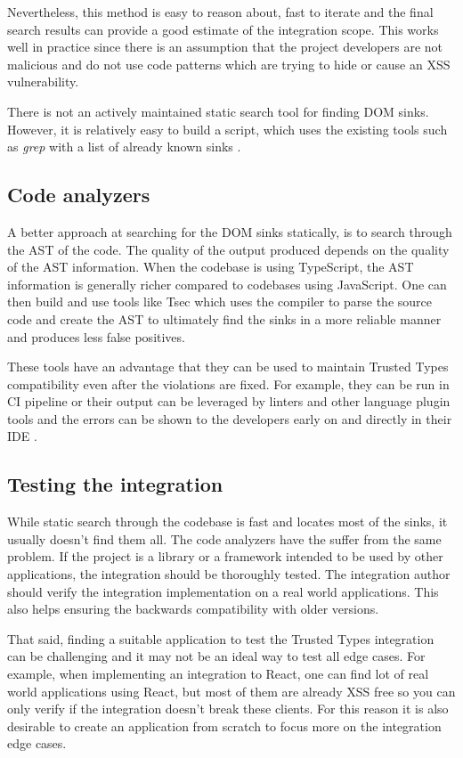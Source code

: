 Nevertheless, this method is easy to reason about, fast to iterate and the final search results can
provide a good estimate of the integration scope. This works well in practice since there is an
assumption that the project developers are not malicious and do not use code patterns which are
trying to hide or cause an XSS vulnerability.

There is not an actively maintained static search tool for finding DOM sinks. However, it is
relatively easy to build a script, which uses the existing tools such as \emph{grep} with a list
of already known sinks \cite{xss_sink_finder}.

\subsection{Code analyzers}

A better approach at searching for the DOM sinks statically, is to search through the AST of the
code. The quality of the output produced depends on the quality of the AST information. When the
codebase is using TypeScript, the AST information is generally richer compared to codebases using
JavaScript. One can then build and use tools like Tsec \cite{tsec_github} which uses the compiler to
parse the source code and create the AST to ultimately find the sinks in a more reliable manner and
produces less false positives.

These tools have an advantage that they can be used to maintain Trusted Types compatibility even
after the violations are fixed. For example, they can be run in CI pipeline or their output can be
leveraged by linters and other language plugin tools and the errors can be shown to the developers
early on and directly in their IDE \cite{tsec_lsp}.

\subsection{Testing the integration}

While static search through the codebase is fast and locates most of the sinks, it usually doesn't
find them all. The code analyzers have the suffer from the same problem. If the project is a library
or a framework intended to be used by other applications, the integration should be thoroughly
tested. The integration author should verify the integration implementation on a real world
applications. This also helps ensuring the backwards compatibility with older versions.

That said, finding a suitable application to test the Trusted Types integration can be challenging
and it may not be an ideal way to test all edge cases. For example, when implementing an integration
to React, one can find lot of real world applications using React, but most of them are already XSS
free so you can only verify if the integration doesn't break these clients. For this reason it is
also desirable to create an application from scratch to focus more on the integration edge cases.

